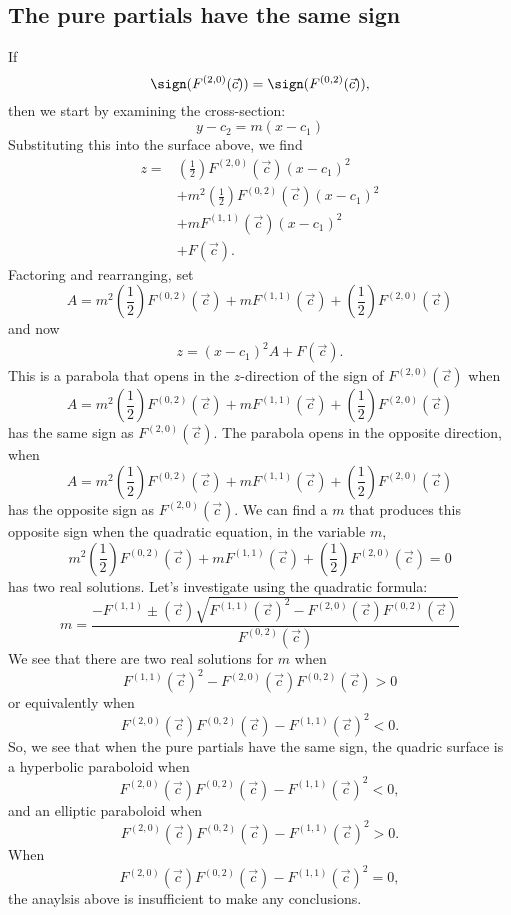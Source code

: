\documentclass{ximera}
\begin{document}
\subsection{The pure partials have the same sign}
If 
\[
\sign(F^{(2,0)}(\vec{c})) = \sign(F^{(0,2)}(\vec{c})),
\]
then we start by examining the cross-section:
\[
y -c_2 = m (x-c_1)
\]
Substituting this into the surface above, we find
\begin{align*}
  z = &\left(\frac{1}{2}\right)F^{(2,0)}(\vec{c})(x-c_1)^2\\
  &+ m^2 \left(\frac{1}{2}\right)F^{(0,2)}(\vec{c})(x-c_1)^2\\
  &+ m F^{(1,1)}(\vec{c}) (x-c_1)^2 \\
  &+ F(\vec{c}).
\end{align*}
Factoring and rearranging, set
\[
A = m^2 \left(\frac{1}{2}\right)F^{(0,2)}(\vec{c}) + m F^{(1,1)}(\vec{c}) + \left(\frac{1}{2}\right)F^{(2,0)}(\vec{c})
\]
and now 
\begin{align*}
z = (x-c_1)^2 A + F(\vec{c}).
\end{align*}
This is a parabola that opens in the $z$-direction of the sign of
$F^{(2,0)}(\vec{c})$ when
\[
A = m^2 \left(\frac{1}{2}\right)F^{(0,2)}(\vec{c}) + m F^{(1,1)}(\vec{c}) + \left(\frac{1}{2}\right)F^{(2,0)}(\vec{c})
\]
has the same sign as $F^{(2,0)}(\vec{c})$.  The parabola opens in the
opposite direction, when
\[
A = m^2 \left(\frac{1}{2}\right)F^{(0,2)}(\vec{c}) + m F^{(1,1)}(\vec{c}) + \left(\frac{1}{2}\right)F^{(2,0)}(\vec{c})
\]
has the opposite sign as $F^{(2,0)}(\vec{c})$.  We can find a $m$ that
produces this opposite sign when the quadratic equation, in the
variable $m$,
\[
m^2 \left(\frac{1}{2}\right)F^{(0,2)}(\vec{c}) + m F^{(1,1)}(\vec{c}) + \left(\frac{1}{2}\right)F^{(2,0)}(\vec{c}) = 0
\]
has two real solutions. Let's investigate using the quadratic formula:
\[
m = \frac{- F^{(1,1)}\pm(\vec{c})\sqrt{F^{(1,1)}(\vec{c})^2-F^{(2,0)}(\vec{c})F^{(0,2)}(\vec{c})}}{F^{(0,2)}(\vec{c})}
\]
We see that there are two real solutions for $m$ when
\[
F^{(1,1)}(\vec{c})^2-F^{(2,0)}(\vec{c})F^{(0,2)}(\vec{c})>0
\]
or equivalently when
\[
F^{(2,0)}(\vec{c})F^{(0,2)}(\vec{c})-F^{(1,1)}(\vec{c})^2<0.
\]
So, we see that when the pure partials have the same sign, the quadric
surface is a hyperbolic paraboloid when
\[
F^{(2,0)}(\vec{c})F^{(0,2)}(\vec{c})-F^{(1,1)}(\vec{c})^2<0,
\]
and an elliptic paraboloid when 
\[
F^{(2,0)}(\vec{c})F^{(0,2)}(\vec{c})-F^{(1,1)}(\vec{c})^2> 0.
\]
When
\[
F^{(2,0)}(\vec{c})F^{(0,2)}(\vec{c})-F^{(1,1)}(\vec{c})^2 =0,
\]
the anaylsis above is insufficient to make any conclusions.
\end{document}
